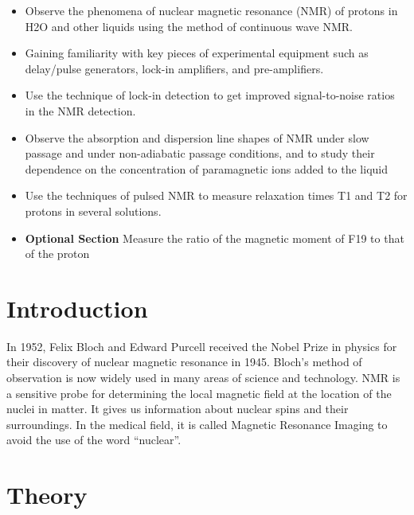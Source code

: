 \documentclass{../lab}
\begin{document}
\begin{itemize}
    \item Observe the phenomena of nuclear magnetic resonance (NMR) of protons in H2O and other liquids using the method of continuous wave NMR. 

    \item Gaining familiarity with key pieces of experimental equipment such as delay/pulse generators, lock-in amplifiers, and pre-amplifiers.

    \item Use the technique of lock-in detection to get improved signal-to-noise ratios in the NMR detection.

    \item Observe the absorption and dispersion line shapes of NMR under slow passage and under non-adiabatic passage conditions, and to study their dependence on the concentration of paramagnetic ions added to the liquid

    \item Use the techniques of pulsed NMR to measure relaxation times T1 and T2 for protons in several solutions.

    \item \textbf{Optional Section} Measure the ratio of the magnetic moment of F19 to that of the proton

\end{itemize}

\section{Introduction}

In 1952, Felix Bloch and Edward Purcell received the Nobel Prize in physics for their discovery of nuclear magnetic resonance in 1945. Bloch's method of observation is now widely used in many areas of science and technology. NMR is a sensitive probe for determining the local magnetic field at the location of the nuclei in matter. It gives us information about nuclear spins and their surroundings. In the medical field, it is called Magnetic Resonance Imaging to avoid the use of the word ``nuclear''.


\section{Theory}
\end{document}
